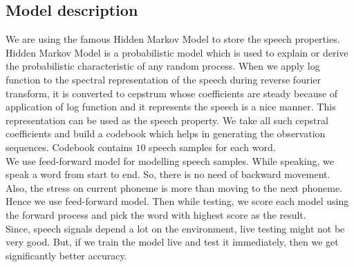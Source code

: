 \documentclass{article}
\begin{document}
\subsection{Model description}
We are using the famous Hidden Markov Model to store the speech properties. Hidden Markov Model is a probabilistic model which is used to explain or derive the probabilistic characteristic of any random process. When we apply log function to the spectral representation of the speech during reverse fourier transform, it is converted to cepstrum whose coefficients are steady because of application of log function and it represents the speech is a nice manner. This representation can be used as the speech property. We take all such cepstral coefficients and build a codebook which helps in generating the observation sequences. Codebook contains $10$ speech samples for each word.\\
We use feed-forward model for modelling speech samples. While speaking, we speak a word from start to end. So, there is no need of backward movement. Also, the stress on current phoneme is more than moving to the next phoneme. Hence we use feed-forward model. Then while testing, we score each model using the forward process and pick the word with highest score as the result.\\
Since, speech signals depend a lot on the environment, live testing might not be very good. But, if we train the model live and test it immediately, then we get significantly better accuracy.
\end{document}
